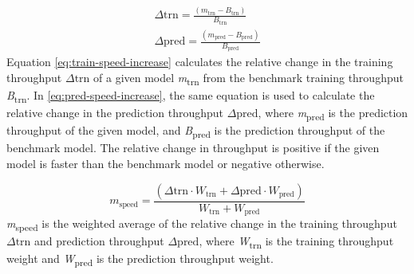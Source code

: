 \begin{subequations}\label{eq:speed-increase}
    \begin{align}
        \label{eq:train-speed-increase}
        \Delta \text{trn} = \frac{\left( m_{\text{trn}} - B_{\text{trn}} \right)}{B_{\text{trn}}} \\
        \label{eq:pred-speed-increase}
        \Delta \text{pred} = \frac{\left( m_{\text{pred}} - B_{\text{pred}} \right)}{B_{\text{pred}}}
    \end{align}
\end{subequations}
Equation \eqref{eq:train-speed-increase} calculates the relative change in the training throughput $\Delta{\text{trn}}$ of a given model \textit{m}\textsubscript{trn} from the benchmark training throughput \textit{B}\textsubscript{trn}. In \eqref{eq:pred-speed-increase}, the same equation is used to calculate the relative change in the prediction throughput $\Delta{\text{pred}}$, where \textit{m}\textsubscript{pred} is the prediction throughput of the given model, and \textit{B}\textsubscript{pred} is the prediction throughput of the benchmark model. The relative change in throughput is positive if the given model is faster than the benchmark model or negative otherwise.

\begin{equation}
    m_{\text{speed}} = \frac{\left(\Delta \text{trn} \cdot W_{\text{trn}} + \Delta \text{pred} \cdot W_{\text{pred}}\right)}{W_{\text{trn}} + W_{\text{pred}}}
    \label{eq:speed-weighted-avg}
\end{equation}
\textit{m}\textsubscript{speed} is the weighted average of the relative change in the training throughput $\Delta{\text{trn}}$ and prediction throughput $\Delta{\text{pred}}$, where \textit{W}\textsubscript{trn} is the training throughput weight and \textit{W}\textsubscript{pred} is the prediction throughput weight.
\\

